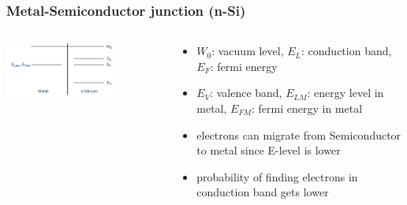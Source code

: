 \documentclass[aspectratio=1610, 12pt]{beamer}
\begin{document}
\begin{frame}\frametitle{Metal-Semiconductor junction (n-Si)}
  \begin{columns}
    \begin{column}[c]{0.48\textwidth}
      \includegraphics[width=0.7\textwidth]{plots/pre_m_s.png}
    \end{column}
    \begin{column}[c]{0.48\textwidth}
      \begin{itemize}
        \item $W_0$: vacuum level, $E_L$: conduction band, $E_F$: fermi energy
        \item $E_V$: valence band, $E_{LM}$: energy level in metal, $E_{FM}$: fermi energy in metal
        \item electrons can migrate from Semiconductor to metal since E-level is lower
        \item probability of finding electrons in conduction band gets lower
      \end{itemize}
    \end{column}
  \end{columns}
\end{frame}
\end{document}
